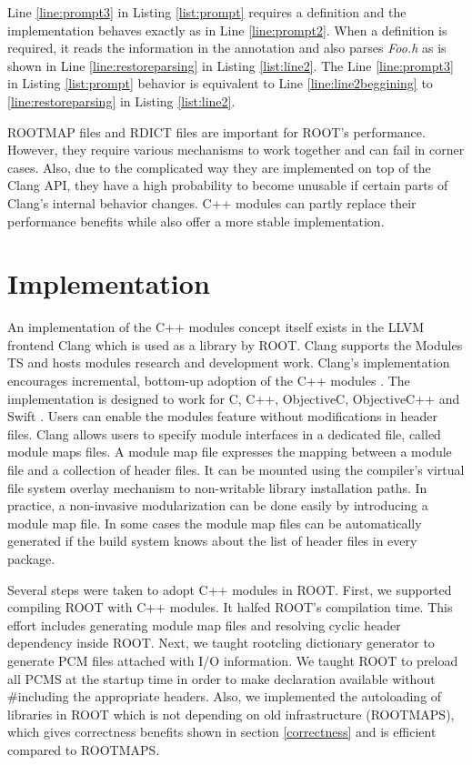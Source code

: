 \documentclass{webofc}
\begin{document}
Line \ref{line:prompt3} in Listing \ref{list:prompt} requires a definition and the implementation behaves exactly as in Line \ref{line:prompt2}. When a definition is required, it reads the information in the annotation and also parses {\it Foo.h} as is shown in Line \ref{line:restoreparsing} in Listing \ref{list:line2}. The Line \ref{line:prompt3} in Listing \ref{list:prompt} behavior is equivalent to Line \ref{line:line2beggining} to \ref{line:restoreparsing} in Listing \ref{list:line2}.

ROOTMAP files and RDICT files are important for ROOT's performance. However, they require various mechanisms to work together and can fail in corner cases. Also, due to the complicated way they are implemented on top of the Clang API, they have a high probability to become unusable if certain parts of Clang's internal behavior changes. C++ modules can partly replace their performance benefits while also offer a more stable implementation.

\section{Implementation}
\label{implementation}

An implementation of the C++ modules concept itself exists in the LLVM frontend Clang \cite{clang-modules-doc} which is used as a library by ROOT. Clang supports the Modules TS and hosts modules research and development work. Clang's implementation encourages incremental, bottom-up adoption of the C++ modules \cite{Smith-cppcon}. The implementation is designed to work for C, C++, ObjectiveC, ObjectiveC++ and Swift \cite{Moduralize-doc}. Users can enable the modules feature without modifications in header files. Clang allows users to specify module interfaces in a dedicated file, called module maps files. A module map file expresses the mapping between a module file and a collection of header files. It can be mounted using the compiler’s virtual file system overlay mechanism to non-writable library installation paths. In practice, a non-invasive modularization can be done easily by introducing a module map file. In some cases the module map files can be automatically generated if the build system knows about the list of header files in every package.

Several steps were taken to adopt C++ modules in ROOT. First, we supported compiling ROOT with C++ modules. It halfed ROOT's compilation time. This effort includes generating module map files and resolving cyclic header dependency inside ROOT. Next, we taught rootcling dictionary generator to generate PCM files attached with I/O information. We taught ROOT to preload all PCMS at the startup time in order to make declaration available without \#including the appropriate headers. Also, we implemented the autoloading of libraries in ROOT which is not depending on old infrastructure (ROOTMAPS), which gives correctness benefits shown in section \ref{correctness} and is efficient compared to ROOTMAPS.
\end{document}
